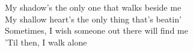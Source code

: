My shadow's the only one that walks beside me \\
My shallow heart's the only thing that's beatin' \\
Sometimes, I wish someone out there will find me \\
'Til then, I walk alone 

